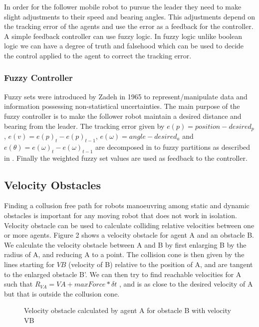 \documentclass[a4paper,12pt]{article}
\begin{document}
In order for the follower mobile robot to pursue the leader they need to make slight adjustments to their speed and bearing angles. This adjustments depend on the tracking error of the agents and use the error as a feedback for the controller. A simple feedback controller can use fuzzy logic. In fuzzy logic unlike boolean logic we can have a degree of truth and falsehood which can be used to decide the control applied to the agent to correct the tracking error.  

\subsubsection{Fuzzy Controller} 
\label{sec:fc}
Fuzzy sets were introduced by Zadeh in 1965 to represent/manipulate data and information possessing non-statistical uncertainties\cite{zadeh1965fuzzy}. The main purpose of the fuzzy controller is to make the follower robot maintain a desired distance and bearing from the leader. The tracking error given by $e(p)=position - desired_p$, $e(v)=e(p)_t - e(p)_{t-1}$, $e(\omega) = angle - desired_a $ and $e(\theta) = e(\omega)_t - e(\omega)_{t-1} $ are decomposed in to fuzzy partitions as described in \cite{bazoula2008formation}. Finally the weighted fuzzy set values are used as feedback to the controller.

\subsection{Velocity Obstacles} 
\label{sec:vo} 
Finding a collusion free path for robots manoeuvring among static and dynamic obstacles is important for any moving robot that does not work in isolation. Velocity obstacle can be used to calculate colliding relative velocities between one or more agents. Figure 2 shows a velocity obstacle for agent A and an obstacle B. We calculate the velocity obstacle between A and B by first enlarging B by the radius of A, and reducing A to a point. The collision cone is then given by the lines starting for $VB$ (velocity of B) relative to the position of A, and are tangent to the enlarged obstacle B'. We can then try to find reachable velocities for A such that $R_{VA}= VA + maxForce*\delta t$ , and is as close to the desired velocity of A but that is outside the collusion cone.

\begin{figure}
\centering
  \caption{Velocity obstacle calculated by agent A for obstacle B with velocity VB} \label{fig:VO}
\end{figure}
\end{document}
